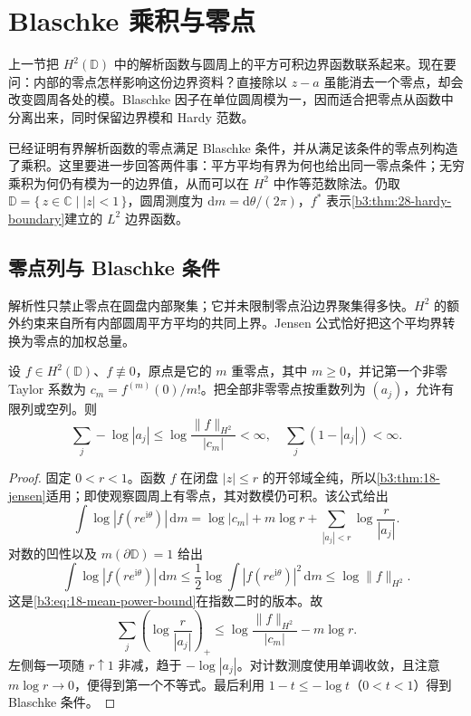 \section{Blaschke 乘积与零点}
\label{b3:sec:2803}

上一节把 \(H^2(\mathbb D)\) 中的解析函数与圆周上的平方可积边界函数联系起来。现在要问：内部的零点怎样影响这份边界资料？直接除以 \(z-a\) 虽能消去一个零点，却会改变圆周各处的模。Blaschke 因子在单位圆周模为一，因而适合把零点从函数中分离出来，同时保留边界模和 Hardy 范数。

\ProseParagraphBreak

已经证明有界解析函数的零点满足 Blaschke 条件，并从满足该条件的零点列构造了乘积。这里要进一步回答两件事：平方平均有界为何也给出同一零点条件；无穷乘积为何仍有模为一的边界值，从而可以在 \(H^2\) 中作等范数除法。仍取 \(\mathbb D=\{\,z\in\mathbb C\mid |z|<1\,\}\)，圆周测度为 \(\mathrm dm=\mathrm d\theta/(2\pi)\)，\(f^*\) 表示\cref{b3:thm:28-hardy-boundary}建立的 \(L^2\) 边界函数。

\subsection{零点列与 Blaschke 条件}
\label{b3:subsec:280301}

解析性只禁止零点在圆盘内部聚集；它并未限制零点沿边界聚集得多快。\(H^2\) 的额外约束来自所有内部圆周平方平均的共同上界。Jensen 公式恰好把这个平均界转换为零点的加权总量。

\begin{theorem}\label{b3:thm:28-hardy-zero-condition}
设 \(f\in H^2(\mathbb D)\)、\(f\not\equiv0\)，原点是它的 \(m\) 重零点，其中 \(m\ge0\)，并记第一个非零 Taylor 系数为 \(c_m=f^{(m)}(0)/m!\)。把全部非零零点按重数列为 \((a_j)\)，允许有限列或空列。则
\begin{equation}\label{b3:eq:28-zero-budget}
 \sum_j-\log|a_j|
 \le \log\frac{\|f\|_{H^2}}{|c_m|}<\infty,
 \quad
 \sum_j(1-|a_j|)<\infty.
\end{equation}
\end{theorem}
\begin{proof}
固定 \(0<r<1\)。函数 \(f\) 在闭盘 \(|z|\le r\) 的开邻域全纯，所以\cref{b3:thm:18-jensen}适用；即使观察圆周上有零点，其对数模仍可积。该公式给出
\[
 \int\log|f(re^{\mathrm i\theta})|\,\mathrm dm
 =\log|c_m|+m\log r
       +\sum_{|a_j|<r}\log\frac r{|a_j|}.
\]
对数的凹性以及 \(m(\partial\mathbb D)=1\) 给出
\[
 \int\log|f(re^{\mathrm i\theta})|\,\mathrm dm
 \le\frac12\log\int|f(re^{\mathrm i\theta})|^2\,\mathrm dm
 \le\log\|f\|_{H^2}.
\]
这是\eqref{b3:eq:18-mean-power-bound}在指数二时的版本。故
\[
 \sum_j\left(\log\frac r{|a_j|}\right)_+
 \le\log\frac{\|f\|_{H^2}}{|c_m|}-m\log r.
\]
左侧每一项随 \(r\uparrow1\) 非减，趋于 \(-\log|a_j|\)。对计数测度使用单调收敛，且注意 \(m\log r\to0\)，便得到第一个不等式。最后利用 \(1-t\le-\log t\)（\(0<t<1\)）得到 Blaschke 条件。
\end{proof}

